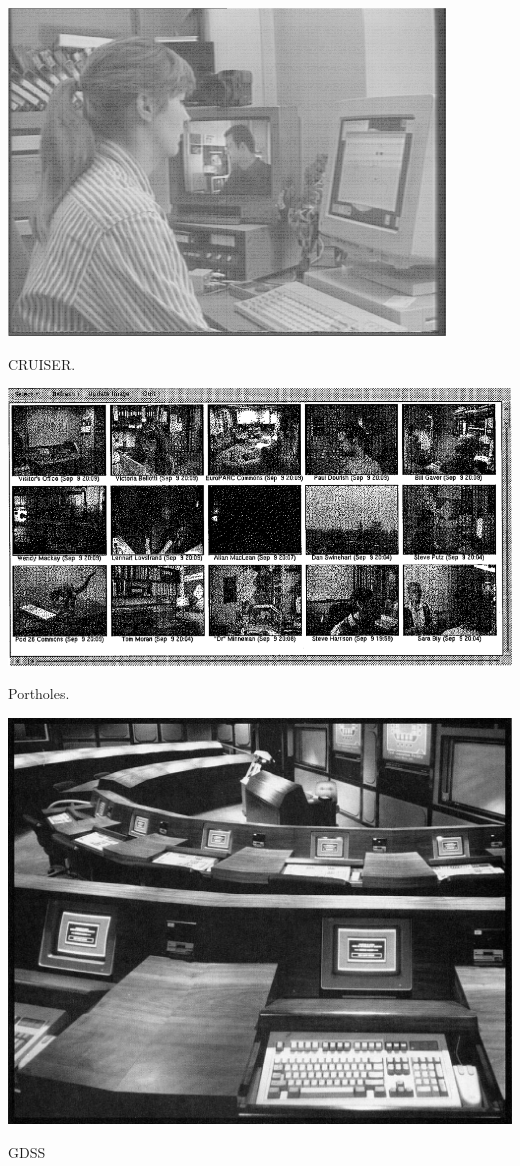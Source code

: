 \documentclass{tufte-handout}
\begin{document}
\begin{marginfigure}
	\includegraphics{figures/CRUISER.png}
	\caption{CRUISER.}
	\label{fig:cruiser}
\end{marginfigure}

\begin{marginfigure}
	\includegraphics{figures/portholes.png}
	\caption{Portholes.}
	\label{fig:portholes}
\end{marginfigure}

\begin{marginfigure}
	\includegraphics{figures/nunamaker_gdss.png}
	\caption{GDSS}
	\label{fig:gdss}
\end{marginfigure}
\end{document}
